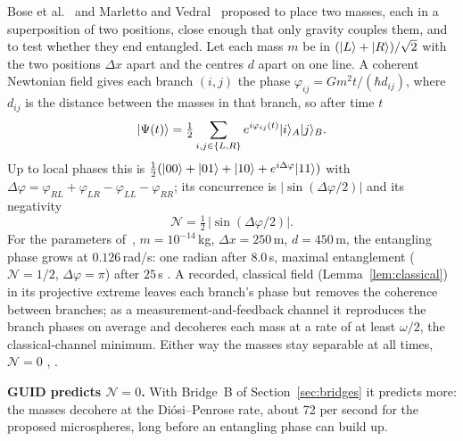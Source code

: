 Bose et al.~\cite{bose} and Marletto and Vedral~\cite{mv} proposed to place two masses, each in a superposition of two positions, close
enough that only gravity couples them, and to test whether they end entangled. Let each mass $m$ be in $(\lvert L\rangle+\lvert R\rangle)/\sqrt2$ with the two
positions $\Delta x$ apart and the centres $d$ apart on one line. A coherent Newtonian field gives each branch $(i,j)$ the phase
$\varphi_{ij}=Gm^2t/(\hbar d_{ij})$, where $d_{ij}$ is the distance between the masses in that branch, so after time $t$
\begin{equation}\label{eq:bmv}
\lvert \Psi(t)\rangle=\tfrac12\sum_{i,j\in\{L,R\}}e^{i\varphi_{ij}(t)}\lvert i\rangle_A\lvert j\rangle_B .
\end{equation}
Up to local phases this is $\tfrac12(\lvert 00\rangle+\lvert 01\rangle+\lvert 10\rangle+e^{i\Delta\varphi}\lvert 11\rangle)$ with
$\Delta\varphi=\varphi_{RL}+\varphi_{LR}-\varphi_{LL}-\varphi_{RR}$; its concurrence is $|\sin(\Delta\varphi/2)|$ and its negativity
\begin{equation}\label{eq:neg}
\mathcal N=\tfrac12\,|\sin(\Delta\varphi/2)|.
\end{equation}
For the parameters of~\cite{bose}, $m=10^{-14}$\,kg, $\Delta x=250$\,\textmu m, $d=450$\,\textmu m, the entangling phase grows at
$0.126$\,rad/s: one radian after $8.0$\,s, maximal entanglement ($\mathcal N=1/2$, $\Delta\varphi=\pi$) after $25$\,s . A recorded,
classical field (Lemma~\ref{lem:classical}) in its projective extreme leaves each branch's phase but removes the coherence between
branches; as a measurement-and-feedback channel it reproduces the branch phases on average and decoheres each mass at a rate of at least
$\omega/2$, the classical-channel minimum. Either way the masses stay separable at all times, $\mathcal N=0$ , .

\textbf{GUID predicts $\mathcal N=0$.} With Bridge~B of Section~\ref{sec:bridges} it predicts more: the masses decohere at the
Di\'osi--Penrose rate, about 72 per second for the proposed microspheres, long before an entangling phase can build up.


